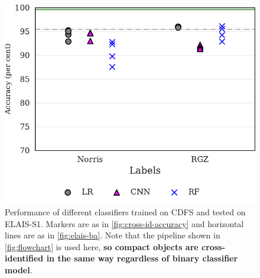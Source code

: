 \documentclass[fleqn,usenatbib,usedcolumn]{mnras}
\newcommand{\edited}[1]{{\bf {#1}}}
\begin{document}
  \begin{figure}
    \centering
    \includegraphics[]{images/elais_cross_identification_grid.pdf}
    \caption{Performance of different classifiers trained on CDFS and tested
    on ELAIS-S1. Markers are as in \autoref{fig:cross-id-accuracy} and
    horizontal lines are as in \autoref{fig:elais-ba}. Note that the pipeline
    shown in \autoref{fig:flowchart} is used here, \edited{so compact objects
    are cross-identified in the same way regardless of binary classifier
    model}.
      \label{fig:elais-cross-id-accuracy}}
  \end{figure}
\end{document}
